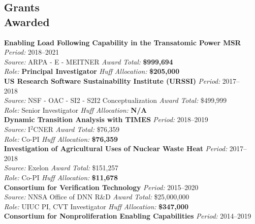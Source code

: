 \documentclass[margin,line]{resume}
\begin{document}
\begin{resume}
    \section{\mysidestyle Grants\\Awarded} 
    \textbf{Enabling Load Following Capability in the Transatomic Power MSR} \hfill \textsl{Period:} 
    2018--2021\\
    \textsl{Source:} ARPA - E - MEITNER \hfill \textsl{Award Total:} \textbf{\$999,694}\\
    \textsl{Role:} \textbf{Principal Investigator} \hfill \textsl{Huff Allocation:} \textbf{\$205,000}\vspace{2mm}\\%
    \textbf{US Research Software Sustainability Institute (URSSI)} \hfill \textsl{Period:} 
    2017--2018\\
    \textsl{Source:} NSF - OAC - SI2 - S2I2 Conceptualization \hfill \textsl{Award Total:} \$499,999\\
    \textsl{Role:} Senior Investigator \hfill \textsl{Huff Allocation:} \textbf{N/A}\vspace{2mm}\\%
    \textbf{Dynamic Transition Analysis with TIMES} \hfill \textsl{Period:} 
    2018--2019\\
    \textsl{Source:} I$^2$CNER \hfill \textsl{Award Total:} \$76,359\\
    \textsl{Role:} Co-PI \hfill \textsl{Huff Allocation:} \textbf{\$76,359}\vspace{2mm}\\%
    \textbf{Investigation of Agricultural Uses of Nuclear Waste Heat} \hfill \textsl{Period:} 2017--2018\\
    \textsl{Source:} Exelon \hfill \textsl{Award Total:} \$151,257\\
    \textsl{Role:} Co-PI \hfill \textsl{Huff Allocation:} \textbf{\$11,678}\vspace{2mm}\\%
    \textbf{Consortium for Verification Technology} \hfill \textsl{Period:} 2015--2020\\ 
    \textsl{Source:} NNSA Office of DNN R\&D \hfill \textsl{Award Total:} \$25,000,000\\
    \textsl{Role:} UIUC PI, CVT Investigator  \hfill \textsl{Huff Allocation:} \textbf{\$347,000}\vspace{2mm}\\%
    \textbf{Consortium for Nonproliferation Enabling Capabilities} \hfill \textsl{Period:} 2014--2019\\ 

\end{resume}
\end{document}

